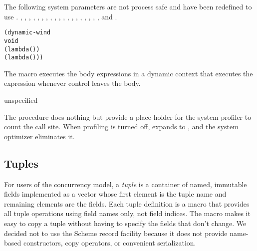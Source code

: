 The following system parameters are not process safe and have
been redefined to use .
,
,
,
,
,
,
,
,
,
,
,
,
,
,
,
,
,
,
, and
.

\begin{syntax}
\end{syntax}
\expandsto{}\begin{alltt}\antipar
(dynamic-wind
  void
  (lambda ()   \etc{})
  (lambda () ))\end{alltt}

The  macro executes the body expressions 
 \etc{} in a dynamic context that executes the 
expression whenever control leaves the body.

\begin{procedure}
\end{procedure}
\returns{} unspecified

The  procedure does nothing but provide a
place-holder for the system profiler to count the call site.  When
profiling is turned off,  expands to
, and the system optimizer eliminates it.

\subsection {Tuples}

For users of the concurrency model, a \emph{tuple} is a
container of named, immutable fields implemented as a vector whose
first element is the tuple name and remaining elements are the
fields. Each tuple definition is a macro that provides all tuple
operations using field names only, not field indices. The macro makes
it easy to copy a tuple without having to specify the fields that
don't change.  We decided not to use the Scheme record facility
because it does not provide name-based constructors, copy operators,
or convenient serialization.

